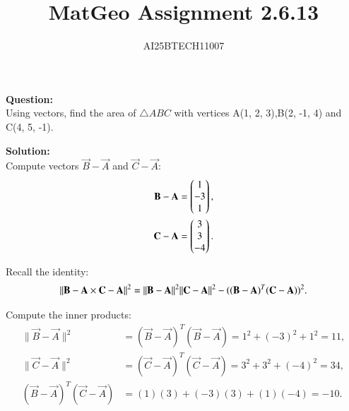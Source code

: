 \documentclass[journal]{IEEEtran}
\begin{document}

\vspace{3cm}

\title{MatGeo Assignment 2.6.13}
\author{AI25BTECH11007}
 \maketitle
{\let\newpage\relax\maketitle}

\renewcommand{\thefigure}{\theenumi}
\renewcommand{\thetable}{\theenumi}
\setlength{\intextsep}{10pt} %


\renewcommand{\thetable}{\theenumi}
\textbf{Question:}\\
Using vectors, find the area of $\triangle ABC$ with vertices A(1, 2, 3),B(2, -1, 4) and C(4, 5, -1).

\textbf{Solution:}\\
 Compute vectors $\vec{B}-\vec{A}$ and $\vec{C}-\vec{A}$:\\
 
\begin{align}
\vec{B}-\vec{A} = \myvec{1\\-3\\1}, \label{eq:AB}\\
\vec{C}-\vec{A} = \myvec{3\\3\\-4}. \label{eq:AC}
\end{align}

Recall the identity:
\begin{equation}
\|\vec{B}-\vec{A}\\ \times \vec{C}-\vec{A}\|^2
= \|\vec{B}-\vec{A}\|^2 \|\vec{C}-\vec{A}\|^2 - ((\vec{B}-\vec{A})^T(\vec{C}-\vec{A}))^2. \label{eq:identity}
\end{equation}

Compute the inner products:
\begin{align}
\|\vec{B}-\vec{A}\|^2 &= (\vec{B}-\vec{A})^T (\vec{B}-\vec{A}) = 1^2 + (-3)^2 + 1^2 = 11, \label{eq:ABsq}\\
\|\vec{C}-\vec{A}\|^2 &= (\vec{C}-\vec{A})^T (\vec{C}-\vec{A}) = 3^2 + 3^2 + (-4)^2 = 34, \label{eq:ACsq}\\
(\vec{B}-\vec{A})^T(\vec{C}-\vec{A}) &= (1)(3) + (-3)(3) + (1)(-4) = -10. \label{eq:dot}
\end{align}
\end{document}
